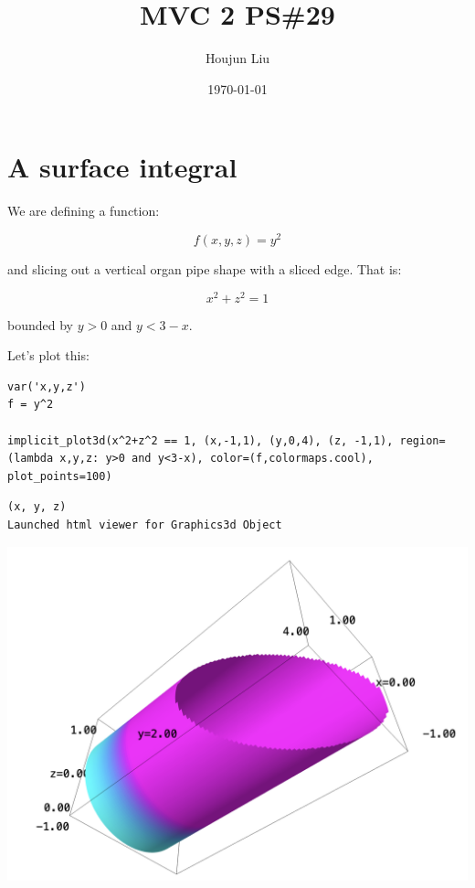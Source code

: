 \documentclass[letterpaper]{article}
\author{Houjun Liu}
\date{\today}
\title{MVC 2 PS\#29}
\renewcommand{\tableofcontents}{}
\renewcommand\maketitle{}
\begin{document}
\maketitle
\tableofcontents


\section{A surface integral}
\label{sec:org7036234}
We are defining a function:

\begin{equation}
   f(x,y,z) = y^2 
\end{equation}

and slicing out a vertical organ pipe shape with a sliced edge. That is:

\begin{equation}
   x^2 + z^2 = 1 
\end{equation}

bounded by \(y>0\) and \(y<3-x\).

Let's plot this:

\begin{verbatim}
var('x,y,z')
f = y^2

implicit_plot3d(x^2+z^2 == 1, (x,-1,1), (y,0,4), (z, -1,1), region=(lambda x,y,z: y>0 and y<3-x), color=(f,colormaps.cool), plot_points=100)
\end{verbatim}

\begin{verbatim}
(x, y, z)
Launched html viewer for Graphics3d Object
\end{verbatim}


\begin{center}
\includegraphics[width=.9\linewidth]{2022-05-23_10-16-40_screenshot.png}
\end{center}
\end{document}
